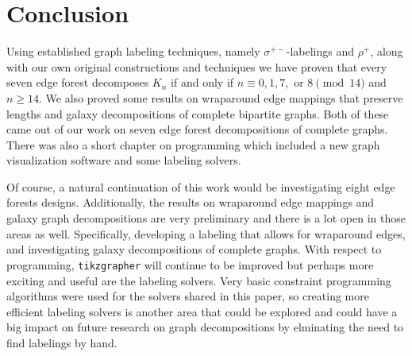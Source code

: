\chapter{Conclusion}
\label{conclusion_chapter}

Using established graph labeling techniques, namely $\sigma^{+-}$-labelings and $\rho^{+}$, along with our own original constructions and techniques we have proven that every seven edge forest decomposes $K_{n}$ if and only if $n\equiv 0,1,7,\text{ or }8\pmod{14}$ and $n\geq 14$. We also proved some results on wraparound edge mappings that preserve lengths and galaxy decompositions of complete bipartite graphs. Both of these came out of our work on seven edge forest decompositions of complete graphs. There was also a short chapter on programming which included a new graph visualization software and some labeling solvers.

Of course, a natural continuation of this work would be investigating eight edge forests designs. Additionally, the results on wraparound edge mappings and galaxy graph decompositions are very preliminary and there is a lot open in those areas as well. Specifically, developing a labeling that allows for wraparound edges, and investigating galaxy decompositions of complete graphs. With respect to programming, \verb|tikzgrapher| will continue to be improved but perhaps more exciting and useful are the labeling solvers. Very basic constraint programming algorithms were used for the solvers shared in this paper, so creating more efficient labeling solvers is another area that could be explored and could have a big impact on future research on graph decompositions by elminating the need to find labelings by hand.
